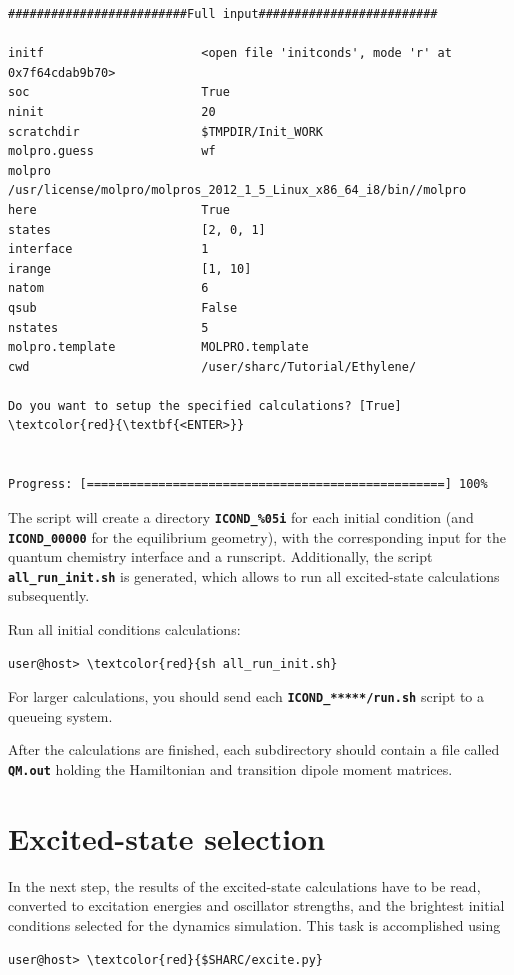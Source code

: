 \documentclass[a4paper,11pt,DIV=15,openany]{scrbook}
\newcommand{\ttt}[1]{\textbf{\texttt{#1}}}
\begin{document}
\begin{oframed}
\begin{Verbatim}[commandchars=\\\{\}]
#########################Full input#########################

initf                      <open file 'initconds', mode 'r' at 0x7f64cdab9b70>
soc                        True
ninit                      20
scratchdir                 $TMPDIR/Init_WORK
molpro.guess               wf
molpro                     /usr/license/molpro/molpros_2012_1_5_Linux_x86_64_i8/bin//molpro
here                       True
states                     [2, 0, 1]
interface                  1
irange                     [1, 10]
natom                      6
qsub                       False
nstates                    5
molpro.template            MOLPRO.template
cwd                        /user/sharc/Tutorial/Ethylene/

Do you want to setup the specified calculations? [True] \textcolor{red}{\textbf{<ENTER>}}


Progress: [==================================================] 100%
\end{Verbatim}
\end{oframed}

\normalsize
The script will create a directory \ttt{ICOND\_\%05i} for each initial condition (and \ttt{ICOND\_00000} for the equilibrium geometry), with the corresponding input for the quantum chemistry interface and a runscript. Additionally, the script \ttt{all\_run\_init.sh} is generated, which allows to run all excited-state calculations subsequently. 

Run all initial conditions calculations:
\begin{Verbatim}[commandchars=\\\{\}]
user@host> \textcolor{red}{sh all_run_init.sh}
\end{Verbatim}
For larger calculations, you should send each \ttt{ICOND\_*****/run.sh} script to a queueing system.

After the calculations are finished, each subdirectory should contain a file called \ttt{QM.out} holding the Hamiltonian and transition dipole moment matrices.


\clearpage
\section{Excited-state selection}

In the next step, the results of the excited-state calculations have to be read, converted to excitation energies and oscillator strengths, and the brightest initial conditions selected for the dynamics simulation. This task is accomplished using 
\begin{Verbatim}[commandchars=\\\{\}]
user@host> \textcolor{red}{$SHARC/excite.py}
\end{Verbatim}
\end{document}
